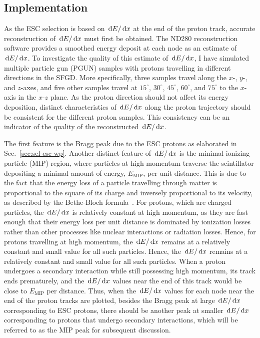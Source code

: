    \subsection{Implementation}
   \label{sec:sel-esc-imp}
	As the ESC selection is based on $\,\textrm{d}E/\,\textrm{d}x$ at the end of the proton track, accurate reconstruction of $\,\textrm{d}E/\,\textrm{d}x$ must first be obtained.
     The ND280 reconstruction software provides a smoothed energy deposit at each node as an estimate of $\,\textrm{d}E/\,\textrm{d}x$.
	To investigate the quality of this estimate of $\,\textrm{d}E/\,\textrm{d}x$, I have simulated multiple particle gun (PGUN) samples with protons travelling in different directions in the SFGD.
	More specifically, three samples travel along the $x$-, $y$-, and $z$-axes, and five other samples travel at $15^\circ$, $30^\circ$, $45^\circ$, $60^\circ$, and $75^\circ$ to the $x$-axis in the $x$-$z$ plane.
	As the proton direction should not affect its energy deposition, distinct characteristics of $\,\textrm{d}E/\,\textrm{d}x$ along the proton trajectory should be consistent for the different proton samples.
     This consistency can be an indicator of the quality of the reconstructed $\,\textrm{d}E/\,\textrm{d}x$.

     The first feature is the Bragg peak due to the ESC protons as elaborated in Sec.~\ref{sec:sel-esc-wp}.
	Another distinct feature of $\,\textrm{d}E/\,\textrm{d}x$ is the minimal ionizing particle (MIP) region, where particles at high momentum traverse the scintillator depositing a minimal amount of energy, $E_{\textrm{MIP}}$, per unit distance.
     This is due to the fact that the energy loss of a particle travelling through matter is proportional to the square of its charge and inversely proportional to its velocity, as described by the Bethe-Bloch formula~\cite{Bethe:1930zza}.
     For protons, which are charged particles, the $\,\textrm{d}E/\,\textrm{d}x$ is relatively constant at high momentum, as they are fast enough that their energy loss per unit distance is dominated by ionization losses rather than other processes like nuclear interactions or radiation losses.
     Hence, for protons travelling at high momentum, the $\,\textrm{d}E/\,\textrm{d}x$ remains at a relatively constant and small value for all such particles.
	Hence, the $\,\textrm{d}E/\,\textrm{d}x$ remains at a relatively constant and small value for all such particles.
     When a proton undergoes a secondary interaction while still possessing high momentum, its track ends prematurely, and the $\,\textrm{d}E/\,\textrm{d}x$ values near the end of this track would be close to $E_{\textrm{MIP}}$ per distance.
	Thus, when the $\,\textrm{d}E/\,\textrm{d}x$ values for each node near the end of the proton tracks are plotted, besides the Bragg peak at large $\,\textrm{d}E/\,\textrm{d}x$ corresponding to ESC protons, there should be another peak at smaller $\,\textrm{d}E/\,\textrm{d}x$ corresponding to protons that undergo secondary interactions, which will be referred to as the MIP peak for subsequent discussion.

